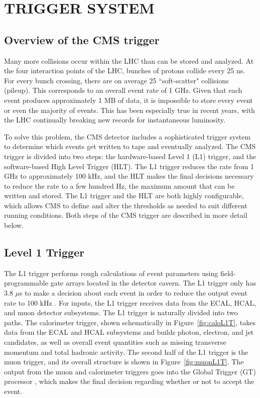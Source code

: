 \chapter{TRIGGER SYSTEM}
\label{chap:Trigger}

\section{Overview of the CMS trigger}
\label{sec:trigOverview}
Many more collisions occur within the LHC than can be stored and analyzed. At the four interaction points of the LHC, bunches of protons collide every 25 ns. For every bunch crossing, there are on average 25 ``soft-scatter" collisions (pileup). This corresponds to an overall event rate of 1 GHz. Given that each event produces approximately 1 MB of data, it is impossible to store every event or even the majority of events. This has been especially true in recent years, with the LHC continually breaking new records for instantaneous luminosity. 

To solve this problem, the CMS detector includes a sophisticated trigger system to determine which events get written to tape and eventually analyzed. The CMS trigger  is divided into two steps: the hardware-based Level 1 (L1) trigger, and the software-based High Level Trigger (HLT). The L1 trigger reduces the rate from 1 GHz to approximately 100 kHz, and the HLT makes the final decisions necessary to reduce the rate to a few hundred Hz, the maximum amount that can be written and stored. The L1 trigger and the HLT are both highly configurable, which allows CMS to define and alter the thresholds as needed to suit different running conditions. Both steps of the CMS trigger are described in more detail below. 


\section{Level 1 Trigger}
\label{sec:L1}
The L1 trigger performs rough calculations of event parameters using field-programmable gate arrays located in the detector cavern. The L1 trigger only has 3.8 $\mu$s to make a decision about each event in order to reduce the output event rate to 100 kHz \cite{L1trig}. For inputs, the L1 trigger receives data from the ECAL, HCAL, and muon detector subsystems. The L1 trigger is naturally divided into two paths. The calorimeter trigger, shown schematically in Figure~\ref{fig:caloL1T}, takes data from the ECAL and HCAL subsystems and builds photon, electron, and jet candidates, as well as overall event quantities such as missing transverse momentum and total hadronic activity. The second half of the L1 trigger is the muon trigger, and its overall structure is shown in Figure~\ref{fig:muonL1T}. The output from the muon and calorimeter triggers goes into the Global Trigger (GT) processor \cite{L1_GT}, which makes the final decision regarding whether or not to accept the event. 


